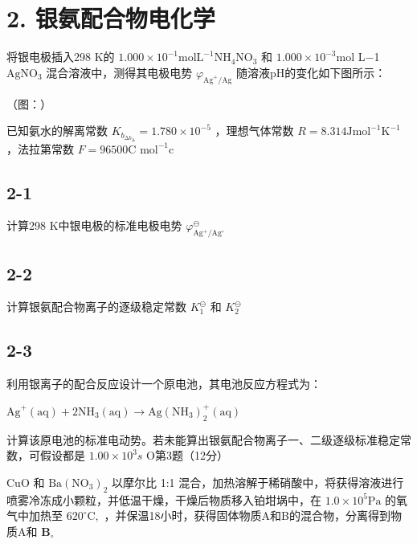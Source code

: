 \section*{2. 银氨配合物电化学}
将银电极插⼊298 K的 $\mathrm { 1 . 0 0 0 \times 1 0 ^ { - 1 } m o l L ^ { - 1 } N H _ { 4 } N O _ { 3 } }$ 和 $1 . 0 0 0 \times 1 0 ^ { - 3 } \mathrm { m o l }$ L−1 $\mathrm { A g N O _ { 3 } }$ 混合溶液中，测得其电极电势 $\varphi _ { \mathrm { A g } ^ { + } / \mathrm { A g } }$ 随溶液pH的变化如下图所⽰：

（图：）

已知氨⽔的解离常数 $K _ { b } _ { \mathrm { \Delta } b } _ { \mathrm { \Delta } } = 1 . 7 8 0 \times 1 0 ^ { - 5 }$ ，理想⽓体常数 $R = 8 . 3 1 4 \mathrm { J } \mathrm { m o l } ^ { - 1 } \mathrm { K } ^ { - 1 }$ ，法拉第常数 $F = 9 6 5 0 0 \mathrm { C }$ $\mathrm { m o l ^ { - 1 } c }$

\subsection*{2-1}
计算298 K中银电极的标准电极电势 $\varphi _ { \mathrm { A g ^ { + } / A g ^ { \circ } } } ^ { \ominus }$

\subsection*{2-2}
计算银氨配合物离⼦的逐级稳定常数 $K _ { 1 } ^ { \ominus }$ 和 $K _ { 2 } ^ { \ominus }$

\subsection*{2-3}
利⽤银离⼦的配合反应设计⼀个原电池，其电池反应⽅程式为：

$
\mathrm{Ag} ^ {+} (\mathrm{aq}) + 2 \mathrm{NH} _ {3} (\mathrm{aq}) \rightarrow \mathrm{Ag} (\mathrm{NH} _ {3}) _ {2} ^ {+} (\mathrm{aq})
$

计算该原电池的标准电动势。若未能算出银氨配合物离⼦⼀、⼆级逐级标准稳定常数，可假设都是 $1 . 0 0 \times 1 0 ^ { 3 } s$ O第3题（12分）

$\mathrm { C u O }$ 和 $\mathrm { B a ( N O _ { 3 } ) _ { 2 } }$ 以摩尔⽐ 1:1 混合，加热溶解于稀硝酸中，将获得溶液进⾏喷雾冷冻成⼩颗粒，并低温⼲燥，⼲燥后物质移⼊铂坩埚中，在 $1 . 0 \times 1 0 ^ { 5 } \mathrm { P a }$ 的氧⽓中加热⾄ $6 2 0 ^ { \circ } \mathrm { C } ,$ ，并保温18⼩时，获得固体物质A和B的混合物，分离得到物质A和 $\mathbf { B } _ { \circ }$

